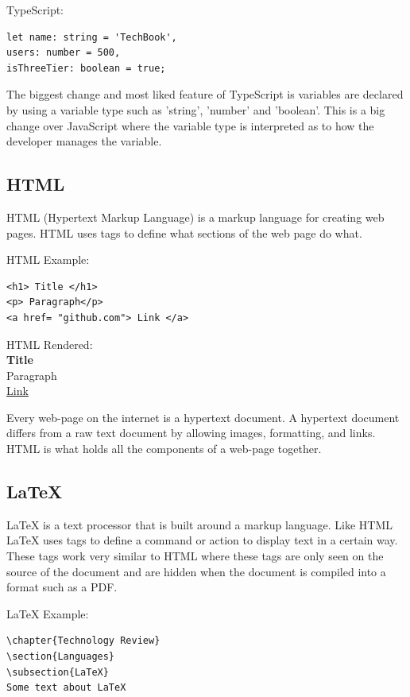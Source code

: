 TypeScript:
\begin{verbatim}
let name: string = 'TechBook',
users: number = 500,
isThreeTier: boolean = true;
\end{verbatim}

The biggest change and most liked feature of TypeScript is variables are declared by using a variable type such as 'string', 'number' and 'boolean'. This is a big change over JavaScript where the variable type is interpreted as to how the developer manages the variable.

\subsection{HTML}
HTML (Hypertext Markup Language) is a markup language for creating web pages. HTML uses tags to define what sections of the web page do what. 

HTML Example:
\begin{verbatim}
<h1> Title </h1>
<p> Paragraph</p>
<a href= "github.com"> Link </a>
\end{verbatim}

HTML Rendered: \\
\textbf{Title} \\
Paragraph \\
\href{http://www.sharelatex.com}{Link}

\vspace{5mm}

Every web-page on the internet is a hypertext document. A hypertext document differs from a raw text document by allowing images, formatting, and links. HTML is what holds all the components of a web-page together. 

\subsection{LaTeX}
LaTeX is a text processor that is built around a markup language. Like HTML LaTeX uses tags to define a command or action to display text in a certain way. These tags work very similar to HTML where these tags are only seen on the source of the document and are hidden when the document is compiled into a format such as a PDF.

LaTeX Example:
\begin{verbatim}
\chapter{Technology Review}
\section{Languages}
\subsection{LaTeX}
Some text about LaTeX
\end{verbatim}

